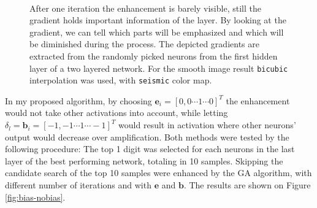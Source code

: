\begin{figure}
    \centering
    \\
    \vfill
    \caption{After one iteration the enhancement is barely visible, still the gradient holds important information of the layer.
    By looking at the gradient, we can tell which parts will be emphasized and which will be diminished during the process.
    The depicted gradients are extracted from the randomly picked neurons from the first hidden layer of a two layered network.
    For the smooth image result \texttt{bicubic} interpolation was used, with \texttt{seismic} color map.
    }
    \label{fig:grad-sub}
\end{figure}

In my proposed algorithm, by choosing $\mathbf{e}_{i} = [0, 0 \cdots 1 \cdots 0]^T$ the enhancement would not take other activations into account, while letting $\delta_l = \mathbf{b}_i = [-1, -1 \cdots 1 \cdots -1]^T$ would result in activation where other neurons' output would decrease over amplification. 
Both methods were tested by the following procedure: The top 1 digit was selected for each neurons in the last layer of the best performing network, totaling in 10 samples. Skipping the candidate search of the top 10 samples were enhanced by the GA algorithm, with different number of iterations and with $\mathbf{e}$ and $ \mathbf{b}$. The results are shown on Figure \ref{fig:bias-nobias}. 

